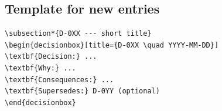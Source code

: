 \subsection*{Template for new entries}
\begin{lstlisting}[language={}]
\subsection*{D-0XX --- short title}
\begin{decisionbox}[title={D-0XX \quad YYYY-MM-DD}]
\textbf{Decision:} ...
\textbf{Why:} ...
\textbf{Consequences:} ...
\textbf{Supersedes:} D-0YY (optional)
\end{decisionbox}
\end{lstlisting}
